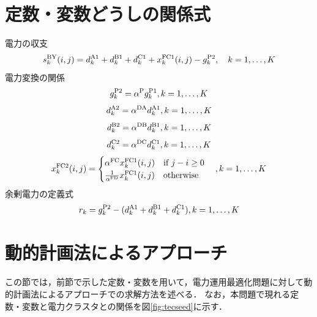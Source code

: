 \documentclass{jarticle}
\begin{document}
\section{定数・変数どうしの関係式}
電力の収支
\begin{equation}
 s_k^{\rm BY}(i,j)= 
 d_k^{\rm A1}+ d_k^{\rm B1} + d_k^{\rm C1}+  x_k^{\rm FC1}(i,j) - g_k^{\rm P2},  \quad k=1,\ldots,K\\
  \label{eq:pass_abst}
\end{equation}
電力変換の関係
\begin{equation}
 g^{\rm P2}_{k} = \alpha^{\rm P} g^{\rm P1}_{k} ,
 \hfill
 k=1,\ldots,K
 \label{eq:gP1gP2}
\end{equation}
%
\begin{equation}
 d^{\rm A2}_{k} = \alpha^{\rm DA} d^{\rm A1}_{k} ,
 \hfill
 k=1,\ldots,K
 \label{eq:dA1A2}
\end{equation}
%
\begin{equation}
 d^{\rm B2}_{k} = \alpha^{\rm DB} d^{\rm B1}_{k},
 \hfill
 k=1,\ldots,K
 \label{eq:dB1B2}
\end{equation}
%
\begin{equation}
 d^{\rm C2}_{k} = \alpha^{\rm DC} d^{\rm C1}_{k},
 \hfill
 k=1,\ldots,K
 \label{eq:dC1C2}
\end{equation}
%
\begin{equation}
 x^{\rm FC2}_{k}(i,j) =\begin{cases}
  \alpha^{\rm FC}x^{\rm FC1}_{k}(i,j)  \quad \text{if } j-i \ge 0 \\
  \frac{1}{\alpha^{\rm FD}}x^{\rm FC1}_{k}(i,j) \quad \text{otherwise }
 \end{cases}
  \hfill
 ,k=1,\ldots,K
 \label{eq:xFC1FC2}
\end{equation}
%
余剰電力の定義式
\begin{equation}
 r_{k} = g^{\rm P2}_k - (d^{\rm A1}_{k}+d^{\rm B1}_{k}+d^{\rm C1}_{k}),
 \hfill
 k=1,\ldots,K
 \label{eq:A2B2C2}
\end{equation}
%



\section{動的計画法によるアプローチ}
この節では，前節で示した定数・変数を用いて，電力運用最適化問題に対して動的計画法によるアプローチでの求解方法を述べる．
なお，本問題で現れる定数・変数と電力クラスタとの関係を図\ref{fig:tecseed}に示す．
\end{document}
